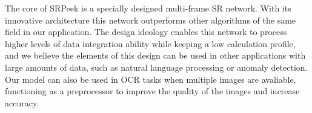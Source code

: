 The core of SRPeek is a specially designed multi-frame SR network. With its innovative architecture this network outperforms other algorithms of the same field in our application. The design ideology enables this network to process higher levels of data integration ability while keeping a low calculation profile, and we believe the elements of this design can be used in other applications with large amounts of data, such as natural language processing or anomaly detection. Our model can also be used in OCR tasks when multiple images are avaliable, functioning as a preprocessor to improve the quality of the images and increase accuracy.